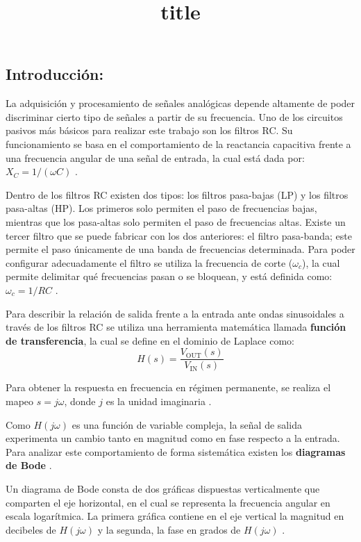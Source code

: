 \documentclass[twocolumn]{article}
\author{}
\title{title}
\begin{document}
\maketitle
\subsection{Introducción:}

La adquisición y procesamiento de señales analógicas depende altamente de poder discriminar cierto tipo de señales a partir de su frecuencia. Uno de los circuitos pasivos más básicos para realizar este trabajo son los filtros RC. Su funcionamiento se basa en el comportamiento de la reactancia capacitiva frente a una frecuencia angular de una señal de entrada, la cual está dada por: $X_C = 1/(\omega C)$ \cite{alexander2018fundamentos}.

Dentro de los filtros RC existen dos tipos: los filtros pasa-bajas (LP) y los filtros pasa-altas (HP). Los primeros solo permiten el paso de frecuencias bajas, mientras que los pasa-altas solo permiten el paso de frecuencias altas. Existe un tercer filtro que se puede fabricar con los dos anteriores: el filtro pasa-banda; este permite el paso únicamente de una banda de frecuencias determinada. Para poder configurar adecuadamente el filtro se utiliza la frecuencia de corte ($\omega_c$), la cual permite delimitar qué frecuencias pasan o se bloquean, y está definida como: $\omega_c = 1/RC$ \cite{nilsson2015circuitos}.

Para describir la relación de salida frente a la entrada ante ondas sinusoidales a través de los filtros RC se utiliza una herramienta matemática llamada \textbf{función de transferencia}, la cual se define en el dominio de Laplace como:
\begin{equation}
  H(s) = \frac{V_{\text{OUT}}(s)}{V_{\text{IN}}(s)}
  \label{eq:Func_trans}
\end{equation}

Para obtener la respuesta en frecuencia en régimen permanente, se realiza el mapeo $s = j\omega$, donde $j$ es la unidad imaginaria \cite{nilsson2015circuitos}.

Como $H(j\omega)$ es una función de variable compleja, la señal de salida experimenta un cambio tanto en magnitud como en fase respecto a la entrada. Para analizar este comportamiento de forma sistemática existen los \textbf{diagramas de Bode} \cite{alexander2018fundamentos}.

Un diagrama de Bode consta de dos gráficas dispuestas verticalmente que comparten el eje horizontal, en el cual se representa la frecuencia angular en escala logarítmica. La primera gráfica contiene en el eje vertical la magnitud en decibeles de $H(j\omega)$ y la segunda, la fase en grados de $H(j\omega)$ \cite{alexander2018fundamentos}.
\end{document}
